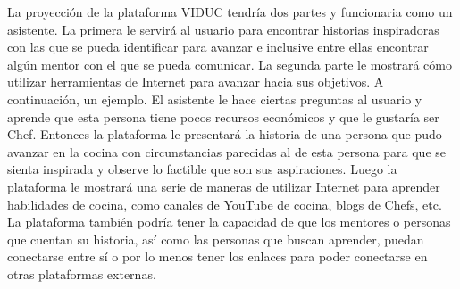 \documentclass[runningheads]{llncs}
\begin{document}
La proyección de la plataforma VIDUC tendría dos partes y funcionaria como un asistente. La primera le servirá al usuario para encontrar historias inspiradoras con las que se pueda identificar para avanzar e inclusive entre ellas encontrar algún mentor con el que se pueda comunicar. La segunda parte le mostrará cómo utilizar herramientas de Internet para avanzar hacia sus objetivos. A continuación, un ejemplo. El asistente le hace ciertas preguntas al usuario y aprende que esta persona tiene pocos recursos económicos y que le gustaría ser Chef. Entonces la plataforma le presentará la historia de una persona que pudo avanzar en la cocina con circunstancias parecidas al de esta persona para que se sienta inspirada y observe lo factible que son sus aspiraciones. Luego la plataforma le mostrará una serie de maneras de utilizar Internet para aprender habilidades de cocina, como canales de YouTube de cocina, blogs de Chefs, etc. La plataforma también podría tener la capacidad de que los mentores o personas que cuentan su historia, así como las personas que buscan aprender, puedan conectarse entre sí o por lo menos tener los enlaces para poder conectarse en otras plataformas externas.\\
\end{document}
